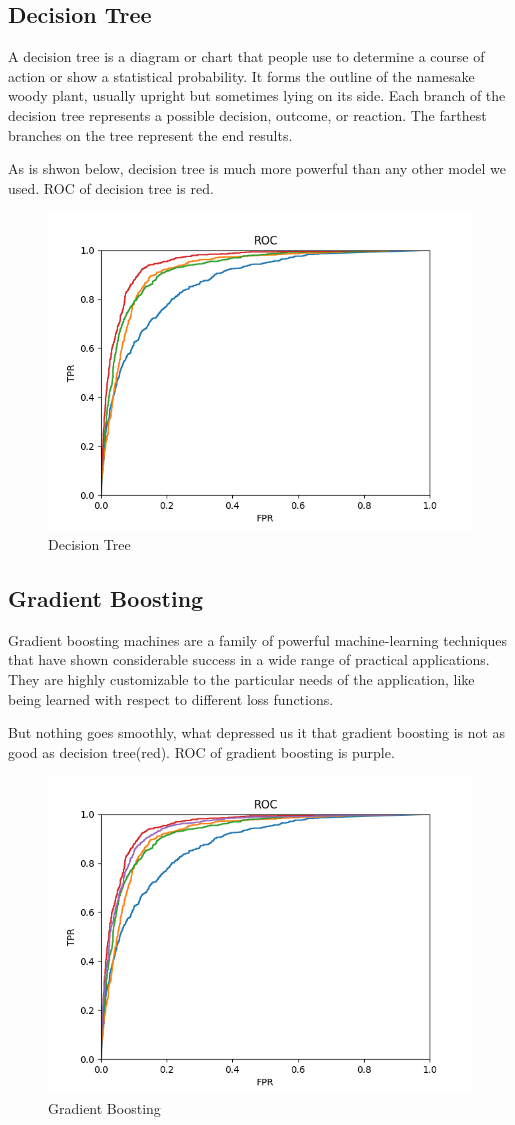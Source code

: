 \documentclass{article}
\begin{document}
\subsection{Decision Tree}
\quad A decision tree is a diagram or chart that people use to determine a course of action or show a statistical probability. It forms the outline of the namesake woody plant, usually upright but sometimes lying on its side. Each branch of the decision tree represents a possible decision, outcome, or reaction. The farthest branches on the tree represent the end results.

As is shwon below, decision tree is much more powerful than any other model we used. ROC of decision tree is red.


\begin{figure}[H]
\centering
\includegraphics[width=.4\textwidth]{XGB.png}
\caption{Decision Tree}
\end{figure}


\subsection{Gradient Boosting}
\quad Gradient boosting machines are a family of powerful machine-learning techniques that have shown considerable success in a wide range of practical applications. They are highly customizable to the particular needs of the application, like being learned with respect to different loss functions.

 But nothing goes smoothly, what depressed us it that gradient boosting is not as good as decision tree(red). ROC of gradient boosting is purple.
\begin{figure}[H]
\centering
\includegraphics[width=.4\textwidth]{GB.png}
\caption{Gradient Boosting}
\end{figure}
\end{document}
